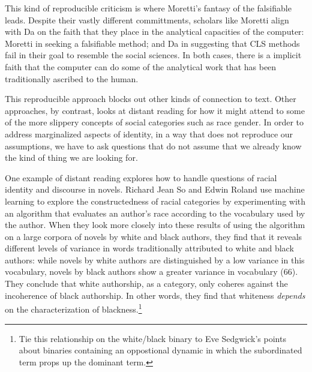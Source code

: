 \documentclass[11pt]{article}
\begin{document}
This kind of reproducible criticism is where Moretti's fantasy of the
falsifiable leads. Despite their vastly different committments,
scholars like Moretti align with Da on the faith that they place in
the analytical capacities of the computer: Moretti in seeking a
falsifiable method; and Da in suggesting that CLS methods fail in
their goal to resemble the social sciences. In both cases, there is a
implicit faith that the computer can do some of the analytical work
that has been traditionally ascribed to the human.

This reproducible approach blocks out other kinds of connection to
text. Other approaches, by contrast, looks at distant reading for how
it might attend to some of the more slippery concepts of social
categories such as race gender. In order to address marginalized
aspects of identity, in a way that does not reproduce our assumptions,
we have to ask questions that do not assume that we already know the
kind of thing we are looking for.

One example of distant reading explores how to handle questions of
racial identity and discourse in novels. Richard Jean So and Edwin
Roland use machine learning to explore the constructedness of racial
categories by experimenting with an algorithm that evaluates an
author's race according to the vocabulary used by the author. When
they look more closely into these results of using the algorithm on a
large corpora of novels by white and black authors, they find that it
reveals different levels of variance in words traditionally attributed
to white and black authors: while novels by white authors are
distinguished by a low variance in this vocabulary, novels by black
authors show a greater variance in vocabulary (66). They conclude that
white authorship, as a category, only coheres against the incoherence
of black authorship. In other words, they find that whiteness
\emph{depends} on the characterization of blackness.\footnote{Tie this relationship on the white/black binary to Eve
Sedgwick's points about binaries containing an oppostional dynamic in
which the subordinated term props up the dominant term.} 
\end{document}

